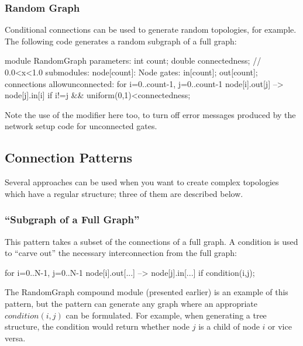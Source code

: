 \subsubsection{Random Graph}

Conditional connections can be used to generate random
topologies, for example. The following code
generates a random subgraph of a full graph:

\begin{ned}
module RandomGraph {
    parameters:
        int count;
        double connectedness; // 0.0<x<1.0
    submodules:
        node[count]: Node {
            gates:
                in[count];
                out[count];
        }
    connections allowunconnected:
        for i=0..count-1, j=0..count-1 {
            node[i].out[j] --> node[j].in[i]
                if i!=j && uniform(0,1)<connectedness;
        }
}
\end{ned}

Note the use of the  modifier
here too, to turn off error messages produced by the network setup code
for unconnected gates.


\subsection{Connection Patterns}


Several approaches can be used when you want to create complex
topologies which have a regular structure; three of them are
described below.


\subsubsection{``Subgraph of a Full Graph''}


This pattern takes a subset of the connections of a full graph.  A
condition is used to ``carve out'' the necessary interconnection from
the full graph:

\begin{ned}
for i=0..N-1, j=0..N-1 {
    node[i].out[...] --> node[j].in[...] if condition(i,j);
}
\end{ned}

The RandomGraph compound module (presented earlier) is an example of
this pattern, but the pattern can generate any graph where an
appropriate $condition(i,j)$ can be formulated. For example,
when generating a tree structure, the condition
would return whether node $j$ is a child of node $i$ or
vice versa.

